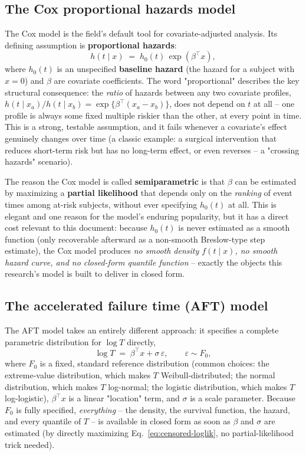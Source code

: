 \documentclass[11pt]{article}
\newcommand{\eps}{\varepsilon}
\begin{document}
\subsection{The Cox proportional hazards model}
\label{sec:cox}

The Cox model \citep{cox1972} is the field's default tool for
covariate-adjusted analysis. Its defining assumption is
\textbf{proportional hazards}:
\begin{equation}
  h(t \mid x) \;=\; h_0(t)\,\exp(\beta^\top x),
  \label{eq:cox}
\end{equation}
where $h_0(t)$ is an unspecified \textbf{baseline hazard} (the hazard for
a subject with $x = 0$) and $\beta$ are covariate coefficients. The word
"proportional" describes the key structural consequence: the
\emph{ratio} of hazards between any two covariate profiles,
$h(t\mid x_a)/h(t\mid x_b) = \exp\{\beta^\top(x_a - x_b)\}$, does not
depend on $t$ at all -- one profile is always some fixed multiple riskier
than the other, at every point in time. This is a strong, testable
assumption, and it fails whenever a covariate's effect genuinely changes
over time (a classic example: a surgical intervention that reduces
short-term risk but has no long-term effect, or even reverses -- a
"crossing hazards" scenario).

The reason the Cox model is called \textbf{semiparametric} is that
$\beta$ can be estimated by maximizing a \textbf{partial likelihood} that
depends only on the \emph{ranking} of event times among at-risk subjects,
without ever specifying $h_0(t)$ at all. This is elegant and one reason
for the model's enduring popularity, but it has a direct cost relevant to
this document: because $h_0(t)$ is never estimated as a smooth function
(only recoverable afterward as a non-smooth Breslow-type step estimate),
the Cox model produces \emph{no smooth density $f(t\mid x)$, no smooth
hazard curve, and no closed-form quantile function} -- exactly the
objects this research's model is built to deliver in closed form.

\subsection{The accelerated failure time (AFT) model}
\label{sec:aft}

The AFT model \citep{wei1992aft} takes an entirely different approach: it
specifies a complete parametric distribution for $\log T$ directly,
\begin{equation}
  \log T \;=\; \beta^\top x + \sigma\,\eps, \qquad \eps \sim F_0,
  \label{eq:aft}
\end{equation}
where $F_0$ is a fixed, standard reference distribution (common choices:
the extreme-value distribution, which makes $T$ Weibull-distributed; the
normal distribution, which makes $T$ log-normal; the logistic
distribution, which makes $T$ log-logistic), $\beta^\top x$ is a linear
"location" term, and $\sigma$ is a scale parameter. Because $F_0$ is
fully specified, \emph{everything} -- the density, the survival function,
the hazard, and every quantile of $T$ -- is available in closed form as
soon as $\beta$ and $\sigma$ are estimated (by directly maximizing
Eq.~\eqref{eq:censored-loglik}, no partial-likelihood trick needed).
\end{document}
